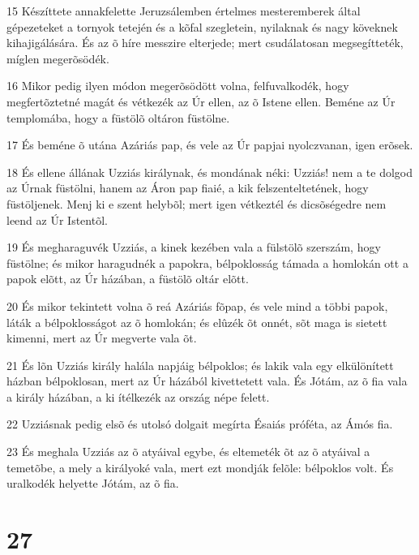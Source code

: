 \par 15 Készíttete annakfelette Jeruzsálemben értelmes mesteremberek által gépezeteket a tornyok tetején és a kõfal szegletein, nyilaknak és nagy köveknek kihajigálására. És az õ híre messzire elterjede; mert csudálatosan megsegítteték, míglen megerõsödék.
\par 16 Mikor pedig ilyen módon megerõsödött volna, felfuvalkodék, hogy megfertõztetné magát és vétkezék az Úr ellen, az õ Istene ellen. Beméne az Úr templomába, hogy a füstölõ oltáron füstölne.
\par 17 És beméne õ utána Azáriás pap, és vele az Úr papjai nyolczvanan, igen erõsek.
\par 18 És ellene állának Uzziás királynak, és mondának néki: Uzziás! nem a te dolgod az Úrnak füstölni, hanem az Áron pap fiaié, a kik felszenteltetének, hogy füstöljenek. Menj ki e szent helybõl; mert igen vétkeztél és dicsõségedre nem leend az Úr Istentõl.
\par 19 És megharaguvék Uzziás, a kinek kezében vala a fülstölõ szerszám, hogy füstölne; és mikor haragudnék a papokra, bélpoklosság támada a homlokán ott a papok elõtt, az Úr házában, a füstölõ oltár elõtt.
\par 20 És mikor tekintett volna õ reá Azáriás fõpap, és vele mind a többi papok, láták a bélpoklosságot az õ homlokán; és elûzék õt onnét, sõt maga is sietett kimenni, mert az Úr megverte vala õt.
\par 21 És lõn Uzziás király halála napjáig bélpoklos; és lakik vala egy elkülönített házban bélpoklosan, mert az Úr házából kivettetett vala. És Jótám, az õ fia vala a király házában, a ki ítélkezék az ország népe felett.
\par 22 Uzziásnak pedig elsõ és utolsó dolgait megírta Ésaiás próféta, az Ámós fia.
\par 23 És meghala Uzziás az õ atyáival egybe, és eltemeték õt az õ atyáival a temetõbe, a mely a királyoké vala, mert ezt mondják felõle: bélpoklos volt. És uralkodék helyette Jótám, az õ fia.

\chapter{27}

